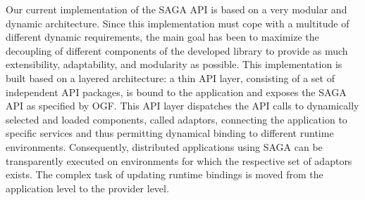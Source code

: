 \documentclass[10pt,letterpaper]{article}
\begin{document}

  Our current
implementation of the SAGA API is based on a very modular and dynamic
architecture.  Since this implementation must cope with a multitude of
different dynamic requirements, the main goal has been to maximize the
decoupling of different components of the developed library to provide
as much extensibility, adaptability, and modularity as possible. This
implementation is built based on a layered architecture: a thin API
layer, consisting of a set of independent API packages,
is bound to the application and exposes the SAGA API as
specified by OGF. This API layer dispatches the API calls to
dynamically selected and loaded components, called adaptors,
connecting the application to specific services and thus permitting
dynamical binding to different runtime environments.  Consequently,
distributed applications using SAGA can be transparently executed on
environments for which the respective set of adaptors exists. The
complex task of updating runtime bindings is moved from the
application level to the provider level.




\end{document}

